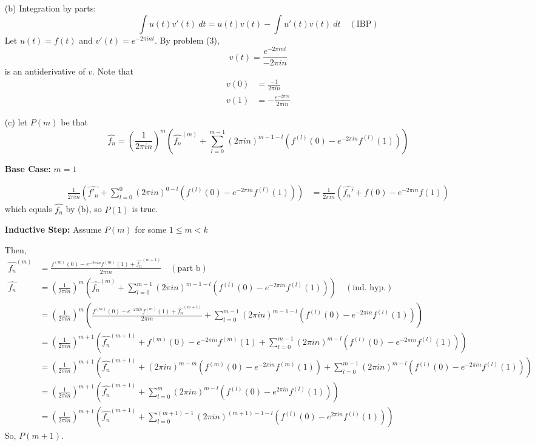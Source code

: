 \documentclass[12pt, reqno]{amsart}
\theoremstyle{definition}
\theoremstyle{remark}
\begin{document}
\begin{itemize}
\begin{itemize}
\begin{itemize}
\vspace{0.1 cm}
\item[(b)] 
Integration by parts: $$\int u(t)v'(t)\ dt= u(t)v(t)-\int u'(t)v(t)\ dt\quad(\text{IBP})$$
Let $u(t)=f(t)$ and $v'(t)=e^{-2\pi int}$. By problem (3), $$v(t)=\frac{e^{-2\pi int}}{-2\pi in}$$is an antiderivative of $v$. Note that \begin{align*}
v(0)&= \frac{-1}{2\pi in}\\
v(1)&= -\frac{e^{-2\pi in}}{{2\pi in}}
\end{align*}

\vspace{0.1 cm}
\item[(c)] 
let $P(m)$ be that $$\hat{f_{n}}= \left(\frac{1}{2\pi in}\right)^{m}\left(\hat{f_{n}}^{(m)}+\sum_{l=0}^{m-1}(2\pi in)^{m-1-l}(f^{(l)}(0)-e^{-2\pi in}f^{(l)}(1))\right)$$


\textbf{Base Case:} $m=1$

\begin{align*}
\frac{1}{2\pi in}\left(\hat{f'_{n}}+\sum_{l=0}^{0}(2\pi in)^{0-l}(f^{(l)}(0)-e^{-2\pi in}f^{(l)}(1))\right)&= \frac{1}{2\pi in}(\hat{f_{n}'}+f(0)-e^{-2\pi in}f(1))
\end{align*}
which equals $\hat{f_{n}}$ by (b), so $P(1)$ is true.

\textbf{Inductive Step:} Assume $P(m)$ for some $1\le m<k$

Then, 
\tiny
\begin{align*}
\hat{f_{n}}^{(m)}&= \frac{f^{(m)}(0)-e^{-2\pi in}f^{(m)}(1)+\hat{f_{n}}^{(m+1)}}{2\pi in}\quad (\text{part b})\\
\hat{f_{n}}&= \left(\frac{1}{2\pi in}\right)^{m}\left(\hat{f_{n}}^{(m)}+\sum_{l=0}^{m-1}(2\pi in)^{m-1-l}(f^{(l)}(0)-e^{-2\pi in}f^{(l)}(1))\right)\quad(\text{ind. hyp.})\\
&= \left(\frac{1}{2\pi in}\right)^{m}\left(\frac{f^{(m)}(0)-e^{-2\pi in}f^{(m)}(1)+\hat{f_{n}}^{(m+1)}}{2\pi in}+\sum_{l=0}^{m-1}(2\pi in)^{m-1-l}(f^{(l)}(0)-e^{-2\pi in}f^{(l)}(1))\right)\\
&= \left(\frac{1}{2\pi in}\right)^{m+1}\left(\hat{f_{n}}^{(m+1)}+f^{(m)}(0)-e^{-2\pi in}f^{(m)}(1)+\sum_{l=0}^{m-1}(2\pi in)^{m-l}(f^{(l)}(0)-e^{-2\pi in}f^{(l)}(1))\right)\\
&= \left(\frac{1}{2\pi in}\right)^{m+1}\left(\hat{f_{n}}^{(m+1)}+(2\pi i n)^{m-m}(f^{(m)}(0)-e^{-2\pi in}f^{(m)}(1))+\sum_{l=0}^{m-1}(2\pi in)^{m-l}(f^{(l)}(0)-e^{-2\pi in}f^{(l)}(1))\right)\\
&= \left(\frac{1}{2\pi in}\right)^{m+1}\left(\hat{f_{n}}^{(m+1)}+\sum_{l=0}^{m}(2\pi in)^{m-l}(f^{(l)}(0)-e^{2\pi in}f^{(l)}(1))\right)\\
&= \left(\frac{1}{2\pi in}\right)^{m+1}\left(\hat{f_{n}}^{(m+1)}+\sum_{l=0}^{(m+1)-1}(2\pi in)^{(m+1)-1-l}(f^{(l)}(0)-e^{2\pi in}f^{(l)}(1))\right)
\end{align*}
\normalsize
So, $P(m+1)$.


\end{itemize}
\end{itemize}
\end{itemize}
\end{document}
